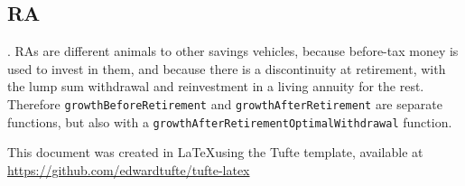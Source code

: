 \documentclass[a4paper, justified]{tufte-handout}
\begin{document}
\subsection{RA}. RAs are different animals to other savings vehicles, because before-tax money is used to invest in them, and because there is a discontinuity at retirement, with the lump sum withdrawal and reinvestment in a living annuity for the rest. Therefore \texttt{growthBeforeRetirement} and \texttt{growthAfterRetirement} are separate functions, but also with a \texttt{growthAfterRetirementOptimalWithdrawal} function. 

\bigskip
This document was created in \LaTeX using the Tufte template, available at \url{https://github.com/edwardtufte/tufte-latex}







%
%
\end{document}
